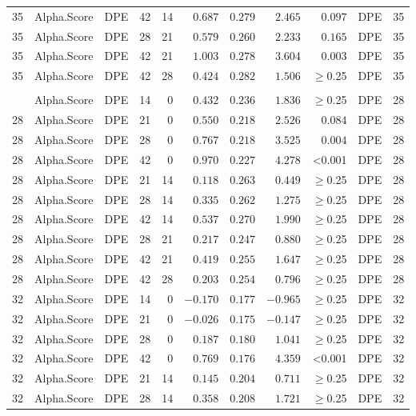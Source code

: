 \documentclass[
]{article}
\begin{document}
\begin{longtable}{cllrrrrrrlc}
35 & Alpha.Score & DPE & 42 & 14 & $0.687$ & $0.279$ & $2.465$ & $0.097$ & DPE & 35 \\ 
35 & Alpha.Score & DPE & 28 & 21 & $0.579$ & $0.260$ & $2.233$ & $0.165$ & DPE & 35 \\ 
35 & Alpha.Score & DPE & 42 & 21 & $1.003$ & $0.278$ & $3.604$ & $0.003$ & DPE & 35 \\ 
35 & Alpha.Score & DPE & 42 & 28 & $0.424$ & $0.282$ & $1.506$ & $\geq$0.25 & DPE & 35 \\ 
\midrule\addlinespace[2.5pt]
\multicolumn{11}{l}{Richness} \\ 
\midrule\addlinespace[2.5pt]
28 & Alpha.Score & DPE & 14 & 0 & $0.432$ & $0.236$ & $1.836$ & $\geq$0.25 & DPE & 28 \\ 
28 & Alpha.Score & DPE & 21 & 0 & $0.550$ & $0.218$ & $2.526$ & $0.084$ & DPE & 28 \\ 
28 & Alpha.Score & DPE & 28 & 0 & $0.767$ & $0.218$ & $3.525$ & $0.004$ & DPE & 28 \\ 
28 & Alpha.Score & DPE & 42 & 0 & $0.970$ & $0.227$ & $4.278$ & <0.001 & DPE & 28 \\ 
28 & Alpha.Score & DPE & 21 & 14 & $0.118$ & $0.263$ & $0.449$ & $\geq$0.25 & DPE & 28 \\ 
28 & Alpha.Score & DPE & 28 & 14 & $0.335$ & $0.262$ & $1.275$ & $\geq$0.25 & DPE & 28 \\ 
28 & Alpha.Score & DPE & 42 & 14 & $0.537$ & $0.270$ & $1.990$ & $\geq$0.25 & DPE & 28 \\ 
28 & Alpha.Score & DPE & 28 & 21 & $0.217$ & $0.247$ & $0.880$ & $\geq$0.25 & DPE & 28 \\ 
28 & Alpha.Score & DPE & 42 & 21 & $0.419$ & $0.255$ & $1.647$ & $\geq$0.25 & DPE & 28 \\ 
28 & Alpha.Score & DPE & 42 & 28 & $0.203$ & $0.254$ & $0.796$ & $\geq$0.25 & DPE & 28 \\ 
32 & Alpha.Score & DPE & 14 & 0 & $-0.170$ & $0.177$ & $-0.965$ & $\geq$0.25 & DPE & 32 \\ 
32 & Alpha.Score & DPE & 21 & 0 & $-0.026$ & $0.175$ & $-0.147$ & $\geq$0.25 & DPE & 32 \\ 
32 & Alpha.Score & DPE & 28 & 0 & $0.187$ & $0.180$ & $1.041$ & $\geq$0.25 & DPE & 32 \\ 
32 & Alpha.Score & DPE & 42 & 0 & $0.769$ & $0.176$ & $4.359$ & <0.001 & DPE & 32 \\ 
32 & Alpha.Score & DPE & 21 & 14 & $0.145$ & $0.204$ & $0.711$ & $\geq$0.25 & DPE & 32 \\ 
32 & Alpha.Score & DPE & 28 & 14 & $0.358$ & $0.208$ & $1.721$ & $\geq$0.25 & DPE & 32 \\ 

\end{longtable}
\end{document}
